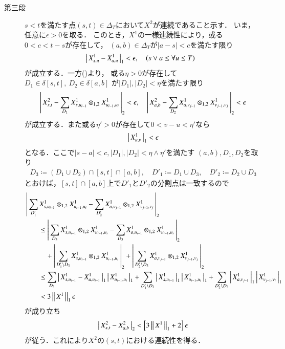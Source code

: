 \begin{prf}
\begin{description}
			\item[第三段]
				$s < t$を満たす点$(s,t) \in \Delta_T$において$X^2$が連続であること示す．
				いま，任意に$\epsilon > 0$を取る．
				このとき，$X^1$の一様連続性により，或る$0 < c < t-s$が存在して，
				$(a,b) \in \Delta_T$が$|a-s| < c$を満たす限り
				\begin{align}
					&\left|\, X^1_{s,u} - X^1_{a,u}\, \right|_{1} < \epsilon,
					\quad (s \vee a \leq \forall u \leq T)
				\end{align}
				が成立する．一方()より，
				或る$\eta > 0$が存在して
				$D_1 \in \delta[s,t],\ D_2 \in \delta[a,b]$
				が$|D_1|,|D_2| < \eta$を満たす限り
				\begin{align}
					\left|\, X^2_{s,t} - \sum_{D_1} X^1_{s,u_{i-1}} \otimes_{1,2} X^1_{u_{i-1},u_i}\, \right|_{2} < \epsilon,
					\quad \left|\, X^2_{a,b} - \sum_{D_2} X^1_{a,v_{j-1}} \otimes_{1,2} X^1_{v_{j-1},v_j}\, \right|_{2} < \epsilon
				\end{align}
				が成立する．また或る$\eta' > 0$が存在して$0 < v-u < \eta'$なら
				\begin{align}
					\left|\, X^1_{u,v}\, \right|_{1} < \epsilon
				\end{align}
				となる．ここで$|s-a| < c,|D_1|,|D_2| < \eta \wedge \eta'$を満たす
				$(a,b),D_1,D_2$を取り
				\begin{align}
					D_3 \coloneqq (D_1 \cup D_2) \cap [s,t] \cap [a,b],
					\quad D'_1 \coloneqq D_1 \cup D_3,
					\quad D'_2 \coloneqq D_2 \cup D_3
				\end{align}
				とおけば，$[s,t] \cap [a,b]$上で$D'_1$と$D'_2$の分割点は一致するので
				\begin{align}
					&\left|\, \sum_{D'_1} X^1_{s,u_{i-1}} \otimes_{1,2} X^1_{u_{i-1},u_i}
						- \sum_{D'_2} X^1_{a,v_{j-1}} \otimes_{1,2} X^1_{v_{j-1},v_j}\, \right|_{2} \\
					&\qquad\leq \left|\, \sum_{D_3} X^1_{s,u_{i-1}} \otimes_{1,2} X^1_{u_{i-1},u_i}
						- \sum_{D_3} X^1_{a,u_{i-1}} \otimes_{1,2} X^1_{u_{i-1},u_i}\, \right|_{2} \\
					&\quad\qquad + \left|\, \sum_{D'_1 \backslash D_3} X^1_{s,u_{i-1}} \otimes_{1,2} X^1_{u_{i-1},u_i}\, \right|_{2}
					+ \left|\, \sum_{D'_2 \backslash D_3} X^1_{a,v_{j-1}} \otimes_{1,2} X^1_{v_{j-1},v_j}\, \right|_{2} \\
					&\qquad\leq \sum_{D_3} \left|\, X^1_{s,u_{i-1}} - X^1_{a,u_{i-1}}\, \right|_{1}
					\left|\, X^1_{u_{i-1},u_i}\, \right|_{1}
					+ \sum_{D'_1 \backslash D_3} \left|\, X^1_{s,u_{i-1}}\, \right|_{1}
						\left|\, X^1_{u_{i-1},u_i}\, \right|_{1}
						+ \sum_{D'_2 \backslash D_3} \left|\, X^1_{a,v_{j-1}}\, \right|_{1}
						\left|\, X^1_{v_{j-1},v_i}\, \right|_{1} \\
					&\qquad< 3 \left\|\, X^1\, \right\|_{1} \epsilon 
				\end{align}
				が成り立ち
				\begin{align}
					\left|\, X^2_{s,t} - X^2_{a,b}\, \right|_{2} < \left[ 3 \left\|\, X^1\, \right\|_{1} + 2\right]\epsilon
				\end{align}
				が従う．これにより$X^2$の$(s,t)$における連続性を得る．
			

\end{description}
\end{prf}
